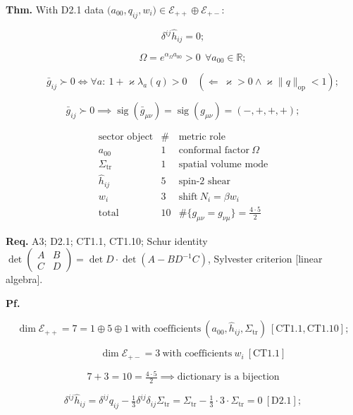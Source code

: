 \begin{theorem}\label{tag:CT1-12}
\textbf{Thm.} With D2.1 data $\bigl(a_{00},q_{ij},w_i\bigr)\in\mathcal E_{++}\oplus\mathcal E_{+-}$:

\[
\delta^{ij}\hat h_{ij}=0;
\]

\[
\qquad \Omega=e^{\alpha_\Omega a_{00}}>0\ \ \forall a_{00}\in\mathbb R;
\]

\[
\qquad \bar g_{ij}\succ0\iff\forall a:\ 1+\varkappa\lambda_a(q)>0\quad(\Leftarrow\ \varkappa>0\wedge\varkappa\|q\|_{\mathrm{op}}<1);
\]

\[
\bar g_{ij}\succ0\implies\operatorname{sig}(\bar g_{\mu\nu})=\operatorname{sig}(g_{\mu\nu})=(-,+,+,+);
\]

\[
\begin{array}{c|c|c}
\text{sector object} & \# & \text{metric role}\\ \hline
a_{00} & 1 & \text{conformal factor}\ \Omega\\
\Sigma_{\mathrm{tr}} & 1 & \text{spatial volume mode}\\
\hat h_{ij} & 5 & \text{spin-2 shear}\\
w_i & 3 & \text{shift}\ N_i=\beta w_i\\ \hline
\text{total} & 10 & \#\{g_{\mu\nu}=g_{\nu\mu}\}=\tfrac{4\cdot5}{2}
\end{array}
\]

\textbf{Req.} A3; D2.1; CT1.1, CT1.10; Schur identity $\det\begin{pmatrix}A&B\\ C&D\end{pmatrix}=\det D\cdot\det(A-BD^{-1}C)$, Sylvester criterion [linear algebra].

\textbf{Pf.}

\[
\dim\mathcal E_{++}=7=1\oplus5\oplus1\ \text{with coefficients}\ (a_{00},\hat h_{ij},\Sigma_{\mathrm{tr}})\ [\mathrm{CT1.1},\mathrm{CT1.10}];
\]

\[
\qquad \dim\mathcal E_{+-}=3\ \text{with coefficients}\ w_i\ [\mathrm{CT1.1}]
\]

\[
7+3=10=\tfrac{4\cdot5}{2}\implies\text{dictionary is a bijection}
\]

\[
\delta^{ij}\hat h_{ij}=\delta^{ij}q_{ij}-\tfrac13\delta^{ij}\delta_{ij}\Sigma_{\mathrm{tr}}=\Sigma_{\mathrm{tr}}-\tfrac13\cdot3\cdot\Sigma_{\mathrm{tr}}=0\ [\mathrm{D2.1}];
\]


\end{theorem}
